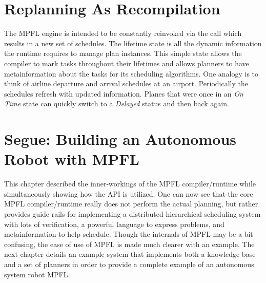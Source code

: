 \section{Replanning As Recompilation}
The MPFL engine is intended to be constantly reinvoked via the  call which results in a new set of schedules. The lifetime state is all the dynamic information the runtime requires to manage plan instances. This simple state allows the compiler to mark tasks throughout their lifetimes and allows planners to have metainformation about the tasks for its scheduling algorithms. One analogy is to think of airline departure and arrival schedules at an airport. Periodically the schedules refresh with updated information. Planes that were once in an \textit{On Time} state can quickly switch to a \textit{Delayed} status and then back again. 

\section{Segue: Building an Autonomous Robot with MPFL}
This chapter described the inner-workings of the MPFL compiler/runtime while simultaneously showing how the API is utilized. One can now see that the core MPFL compiler/runtime really does not perform the actual planning, but rather provides guide rails for implementing a distributed hierarchical scheduling system with lots of verification, a powerful language to express problems, and metainformation to help schedule. Though the internals of MPFL may be a bit confusing, the ease of use of MPFL is made much clearer with an example. The next chapter details an example system that implements both a knowledge base and a set of planners in order to provide a complete example of an autonomous system robot MPFL.


